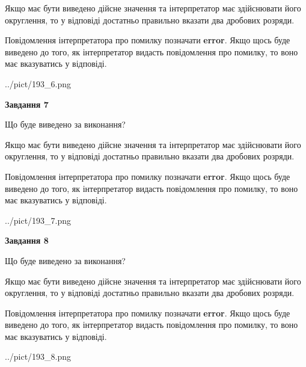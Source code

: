 \documentclass[12pt, ukrainian]{article}
\begin{document}
{\begin {Large}
Якщо має бути виведено дійсне значення та інтерпретатор має здійснювати його округлення, 
то у відповіді достатньо правильно вказати два дробових розряди.

Повідомлення інтерпретатора про помилку позначати \textbf{error}.
Якщо щось буде виведено до того, як інтерпретатор видасть повідомлення про помилку, 
то воно має вказуватись у відповіді. \par

\begin{center}
	{../pict/193_6.png}
\end{center}
\newpage

{\begin {center}\textbf{Завдання 7}\end {center}}\par
Що буде виведено за виконання? \par

Якщо має бути виведено дійсне значення та інтерпретатор має здійснювати його округлення, 
то у відповіді достатньо правильно вказати два дробових розряди.

Повідомлення інтерпретатора про помилку позначати \textbf{error}.
Якщо щось буде виведено до того, як інтерпретатор видасть повідомлення про помилку, 
то воно має вказуватись у відповіді. \par

\begin{center}
	{../pict/193_7.png}
\end{center}
\newpage

{\begin {center}\textbf{Завдання 8}\end {center}}\par
Що буде виведено за виконання? \par

Якщо має бути виведено дійсне значення та інтерпретатор має здійснювати його округлення, 
то у відповіді достатньо правильно вказати два дробових розряди.

Повідомлення інтерпретатора про помилку позначати \textbf{error}.
Якщо щось буде виведено до того, як інтерпретатор видасть повідомлення про помилку, 
то воно має вказуватись у відповіді. \par

\begin{center}
	{../pict/193_8.png}
\end{center}
\newpage


\end{Large}}
\end{document}
